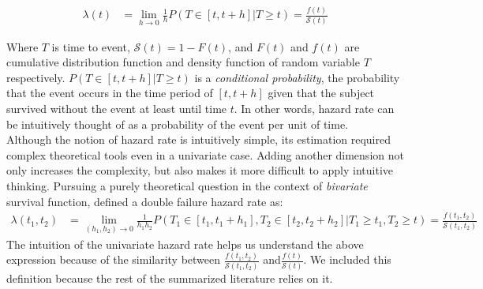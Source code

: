 \documentclass[]{article}
\begin{document}
$$
\begin{aligned}
	\lambda(t) &= \lim_{h\rightarrow 0} \frac{1}{h} P(T\in[t,t+h] | T\geq t)=
	             \frac{f(t)}{\mathcal{S}(t)}
\end{aligned}
$$

Where $T$ is time to event, $\mathcal{S}(t) = 1-F(t)$, and $F(t)$ and $f(t)$ are cumulative distribution function and density function of random variable $T$ respectively. $P(T\in[t,t+h] | T\geq t)$ is a \emph{conditional probability}, the probability that the event occurs in the time period of $[t,t+h]$ given that the subject survived without the event at least until time $t$. In other words, hazard rate can be intuitively thought of as a probability of the event per unit of time.\\
Although the notion of hazard rate is intuitively simple, its estimation required complex theoretical tools even in a univariate case. Adding another dimension not only increases the complexity, but also makes it more difficult to apply intuitive thinking. Pursuing a purely theoretical question in the context of \emph{bivariate} survival function, \cite{basu1971bivariate} %
defined a double failure hazard rate as:
$$
\begin{aligned}
	\lambda(t_1,t_2)&= \lim_{(h_1,h_2)\rightarrow 0} \frac{1}{h_1 h_2} P(T_1\in[t_1,t_1+h_1], T_2\in[t_2,t_2+h_2] | T_1\geq t_1, T_2 \geq t)=
	 \frac{f(t_1,t_2)}{\mathcal{S}(t_1,t_2)}
\end{aligned}
$$
The intuition of the univariate hazard rate helps us understand the above expression because of the similarity between $\frac{f(t_1,t_2)}{\mathcal{S}(t_1,t_2)}$ and$\frac{f(t)}{\mathcal{S}(t)}$. We included this definition because the rest of the summarized literature relies on it.\\
\end{document}
